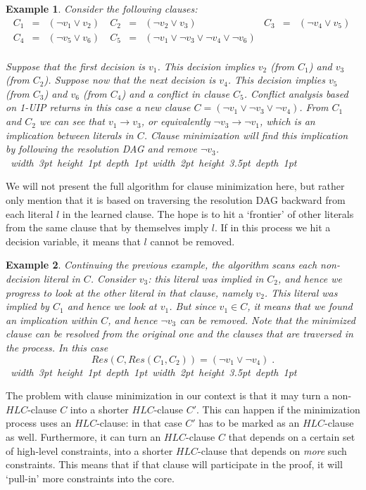 \documentclass[twoside,11pt]{article}
\newcommand\qed{\hfill\hbox{\hskip 4pt
                \vrule width 3pt height 1pt depth 1pt
                \hbox{\vrule width 2pt height 3.5pt depth 1pt}}}
\newtheorem{example}{Example}
\begin{document}
\begin{example}
Consider the following clauses:
\[ \begin{array}{lllllllll}
C_1 &=& ( \lnot v_1 \lor  v_2)\ & C_2 &=& ( \lnot v_2 \lor  v_3)\ & C_3 &=& ( \lnot v_4 \lor  v_5)\ \\
C_4 &=& ( \lnot v_5 \lor  v_6)\ & C_5 &=& ( \lnot v_1 \lor  \lnot v_3 \lor  \lnot v_4 \lor  \lnot v_6)\\
\end{array}
\]

Suppose that the first decision is $v_1$. This decision implies $v_2$ (from $C_1$) and $v_3$ (from $C_2$). Suppose now that the next decision is $v_4$. This decision implies $v_5$ (from $C_3$) and $v_6$ (from $C_4$) and a conflict in clause $C_5$.
  Conflict analysis based on 1-UIP returns in this case a new clause $C = ( \lnot v_1 \lor  \lnot v_3  \lor  \lnot v_4)$. From $C_1$ and $C_2$ we can see that $v_1 \rightarrow v_3$, or equivalently $\lnot v_3 \rightarrow \lnot v_1$, which is an implication between literals in $C$. Clause minimization will find this implication by following the resolution DAG and remove  $\lnot v_3$.
\qed
\end{example}

We will not present the full algorithm for clause minimization here, but rather only mention that it is based on traversing the resolution DAG backward from each literal $l$ in the learned clause. The hope is to hit a `frontier' of other literals from the same clause that by themselves imply $l$. If in this process we hit a decision variable, it means that $l$ cannot be removed.

\begin{example}
Continuing the previous example, the algorithm scans each non-decision literal in $C$. Consider $v_3$: this literal was implied in $C_2$, and hence we progress to look at the other literal in that clause, namely $v_2$. This literal was implied by $C_1$ and hence we look at $v_1$. But since $v_1 \in C$, it means that we found an implication within $C$, and hence $\lnot v_3$ can be removed. Note that the minimized clause can be resolved from the original one and the clauses that are traversed in the process. In this case
\[Res(C, Res(C_1, C_2)) = (\lnot v_1 \lor \lnot v_4)\;.\]
\qed
\end{example}

The problem with clause minimization in our context is that it may turn a non-$HLC$-clause $C$ into a shorter $HLC$-clause $C'$. This can happen if the minimization process uses an $HLC$-clause: in that case $C'$ has to be marked as an $HLC$-clause as well. Furthermore, it can turn an $HLC$-clause $C$ that depends on a certain set of high-level constraints, into a shorter $HLC$-clause that depends on \emph{more} such constraints. This means that if that clause will participate in the proof, it will `pull-in' more constraints into the core.
\end{document}
